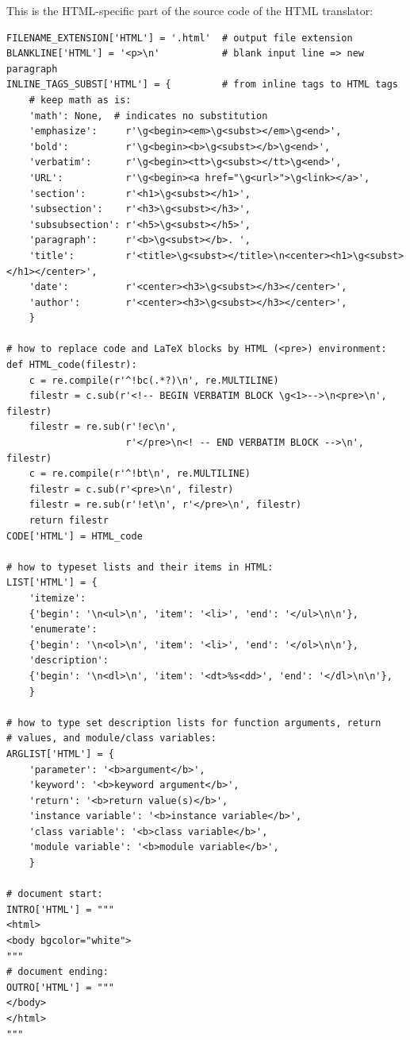 \documentclass{article}
\begin{document}
This is the HTML-specific part of the
source code of the HTML translator:
\begin{Verbatim}[fontsize=\fontsize{9pt}{9pt},tabsize=8,baselinestretch=0.85,
fontfamily=tt,xleftmargin=7mm]
FILENAME_EXTENSION['HTML'] = '.html'  # output file extension
BLANKLINE['HTML'] = '<p>\n'           # blank input line => new paragraph
INLINE_TAGS_SUBST['HTML'] = {         # from inline tags to HTML tags
    # keep math as is:
    'math': None,  # indicates no substitution
    'emphasize':     r'\g<begin><em>\g<subst></em>\g<end>',
    'bold':          r'\g<begin><b>\g<subst></b>\g<end>',
    'verbatim':      r'\g<begin><tt>\g<subst></tt>\g<end>',
    'URL':           r'\g<begin><a href="\g<url>">\g<link></a>',
    'section':       r'<h1>\g<subst></h1>',
    'subsection':    r'<h3>\g<subst></h3>',
    'subsubsection': r'<h5>\g<subst></h5>',
    'paragraph':     r'<b>\g<subst></b>. ',
    'title':         r'<title>\g<subst></title>\n<center><h1>\g<subst></h1></center>',
    'date':          r'<center><h3>\g<subst></h3></center>',
    'author':        r'<center><h3>\g<subst></h3></center>',
    }

# how to replace code and LaTeX blocks by HTML (<pre>) environment:
def HTML_code(filestr):
    c = re.compile(r'^!bc(.*?)\n', re.MULTILINE)
    filestr = c.sub(r'<!-- BEGIN VERBATIM BLOCK \g<1>-->\n<pre>\n', filestr)
    filestr = re.sub(r'!ec\n',
                     r'</pre>\n<! -- END VERBATIM BLOCK -->\n', filestr)
    c = re.compile(r'^!bt\n', re.MULTILINE)
    filestr = c.sub(r'<pre>\n', filestr)
    filestr = re.sub(r'!et\n', r'</pre>\n', filestr)
    return filestr
CODE['HTML'] = HTML_code

# how to typeset lists and their items in HTML:
LIST['HTML'] = {
    'itemize':
    {'begin': '\n<ul>\n', 'item': '<li>', 'end': '</ul>\n\n'},
    'enumerate':
    {'begin': '\n<ol>\n', 'item': '<li>', 'end': '</ol>\n\n'},
    'description':
    {'begin': '\n<dl>\n', 'item': '<dt>%s<dd>', 'end': '</dl>\n\n'},
    }

# how to type set description lists for function arguments, return
# values, and module/class variables:
ARGLIST['HTML'] = {
    'parameter': '<b>argument</b>',
    'keyword': '<b>keyword argument</b>',
    'return': '<b>return value(s)</b>',
    'instance variable': '<b>instance variable</b>',
    'class variable': '<b>class variable</b>',
    'module variable': '<b>module variable</b>',
    }

# document start:
INTRO['HTML'] = """
<html>
<body bgcolor="white">
"""
# document ending:
OUTRO['HTML'] = """
</body>
</html>
"""
\end{Verbatim}
\noindent
\end{document}
